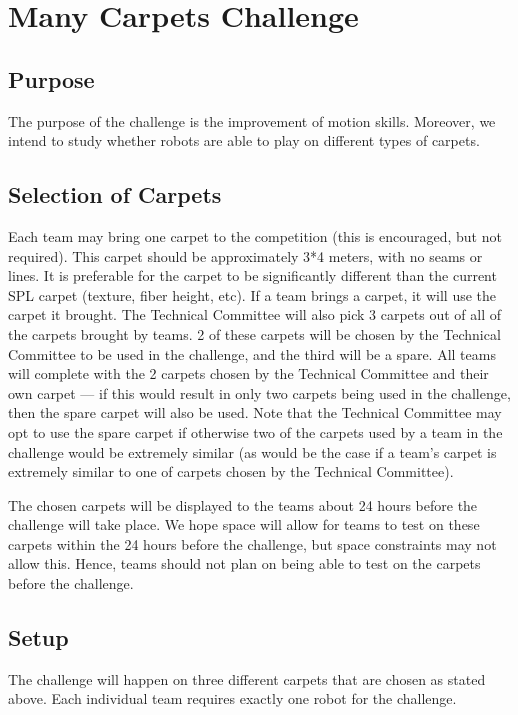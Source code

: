 \documentclass[12pt]{article}
\begin{document}
\section{Many Carpets Challenge}

\subsection{Purpose}

The purpose of the challenge is the improvement of motion skills. Moreover, we intend to study whether robots are able to play on different types of carpets.

\subsection{Selection of Carpets}

Each team may bring one carpet to the competition (this is encouraged, but not required). This carpet should be approximately 3*4 meters, with no seams or lines.  It is preferable for the carpet to be significantly different than the current SPL carpet (texture, fiber height, etc). If a team brings a carpet, it will use the carpet it brought.  The Technical Committee will also pick 3 carpets out of all of the carpets brought by teams.  2 of these carpets will be chosen by the Technical Committee to be used in the challenge, and the third will be a spare.  All teams will complete with the 2 carpets chosen by the Technical Committee and their own carpet --- if this would result in only two carpets being used in the challenge, then the spare carpet will also be used.  Note that the Technical Committee may opt to use the spare carpet if otherwise two of the carpets used by a team in the challenge would be extremely similar (as would be the case if a team's carpet is extremely similar to one of carpets chosen by the Technical Committee).

The chosen carpets will be displayed to the teams about 24 hours before the challenge will take place.  We hope space will allow for teams to test on these carpets within the 24 hours before the challenge, but space constraints may not allow this.  Hence, teams should not plan on being able to test on the carpets before the challenge.

\subsection{Setup}

The challenge will happen on three different carpets that are chosen as stated above.   Each individual team requires exactly one robot for the challenge.
\end{document}

